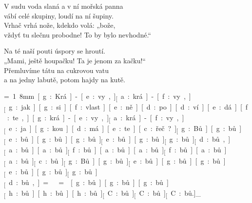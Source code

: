 V sudu voda slaná a v ní mořská panna\\
vábí celé skupiny, loudí na ní šupiny.\\
Vrhač vrhá nože, kdekdo volá: „bože,\\
vždyť tu slečnu probodne! To by bylo nevhodné.“

Na té naší pouti úspory se hroutí.\\
„Mami, ještě houpačku! Ta je jenom za kačku!“\\
Přemluvíme tátu na cukrovou vatu\\
a na jedny labutě, potom hajdy na kutě.



{\unit=1.8mm
[g:Krá]-[e:vy,]_ [a:krá]-[f:vy,]_
[g:jak] [g:si] [f:vlast][e:ně] [d:po][d:ví][e:dá][f:te,]

[g:krá]-[e:vy,]_ [a:krá]-[f:vy,]_
[e:ja][g:kou] [d:má][e:te] [c:řeč?]_

[g:Bů] [g:bů]_ [e:bů] [g:bů] [g:bů]_
[e:bů] [g:bů]_ [g:bů]_ [d:bů,]_

[a:bů] [a:bů]_ [f:bů] [a:bů] [a:bů]_
[f:bů] [a:bů]_ [a:bů]_ [c:bů.]_

[g:Bů] [g:bů]_ [e:bů] [g:bů] [g:bů]_
[e:bů] [g:bů]_ [g:bů]_ [d:bů,]_

\min=
\max=
[g:bů] [g:bů] [g:bů]_
[h:bů] [h:bů] [h:bů]_
[C:bů]_ [C:bů]_ [C:bů.]_
}

\bye
